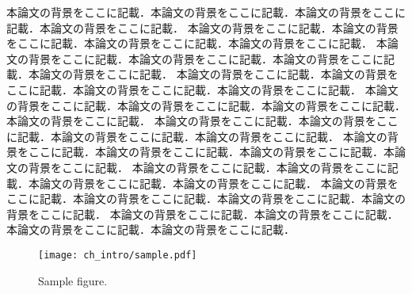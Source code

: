 本論文の背景をここに記載．本論文の背景をここに記載．本論文の背景をここに記載．本論文の背景をここに記載．
本論文の背景をここに記載．本論文の背景をここに記載．本論文の背景をここに記載．本論文の背景をここに記載．
本論文の背景をここに記載．本論文の背景をここに記載．本論文の背景をここに記載．本論文の背景をここに記載．
本論文の背景をここに記載．本論文の背景をここに記載．本論文の背景をここに記載．本論文の背景をここに記載．
本論文の背景をここに記載．本論文の背景をここに記載．本論文の背景をここに記載．本論文の背景をここに記載．
本論文の背景をここに記載．本論文の背景をここに記載．本論文の背景をここに記載．本論文の背景をここに記載．
本論文の背景をここに記載．本論文の背景をここに記載．本論文の背景をここに記載．本論文の背景をここに記載．
本論文の背景をここに記載．本論文の背景をここに記載．本論文の背景をここに記載．本論文の背景をここに記載．
本論文の背景をここに記載．本論文の背景をここに記載．本論文の背景をここに記載．本論文の背景をここに記載．
本論文の背景をここに記載．本論文の背景をここに記載．本論文の背景をここに記載．本論文の背景をここに記載．

\begin{figure}[!t]
\centering
\texttt{[image: ch\_intro/sample.pdf]}
\caption{Sample figure.}
\label{fig:intro:sample}
\end{figure}

